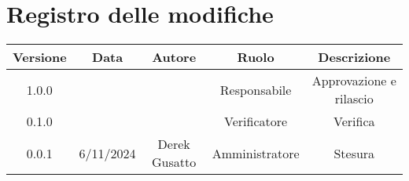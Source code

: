 
\section*{Registro delle modifiche}
\begin{table}[H]
    \begin{tabular}{|c|c|c|c|c|}
        \hline
         \textbf{Versione} &  \textbf{Data} &  \textbf{Autore} &  \textbf{Ruolo} & \textbf{Descrizione} \\
          \hline
          1.0.0 &  &  & Responsabile & Approvazione e rilascio\\
          \hline
          0.1.0 &  &  & Verificatore &  Verifica \\
          \hline
          0.0.1 & 6/11/2024 & Derek Gusatto & Amministratore & Stesura \\
          \hline
    \end{tabular}
\end{table}